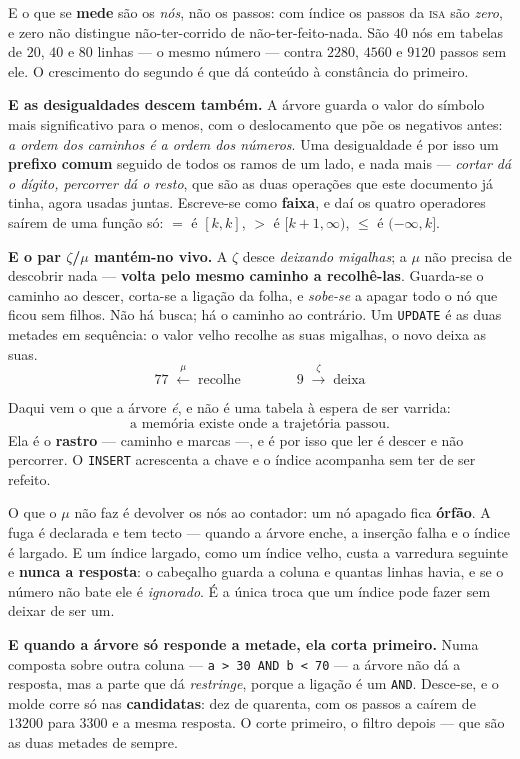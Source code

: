 \documentclass[11pt,a4paper]{article}
\newcommand{\code}[1]{\texttt{\small #1}}
\begin{document}
\medskip\noindent E o que se \textbf{mede} são os \emph{nós}, não os passos:
com índice os passos da \textsc{isa} são \emph{zero}, e zero não distingue
não-ter-corrido de não-ter-feito-nada. São $40$ nós em tabelas de $20$, $40$ e
$80$ linhas --- o mesmo número --- contra $2280$, $4560$ e $9120$ passos sem
ele. O crescimento do segundo é que dá conteúdo à constância do primeiro.

\medskip\noindent\textbf{E as desigualdades descem também.} A árvore guarda o
valor do símbolo mais significativo para o menos, com o deslocamento que põe os
negativos antes: \emph{a ordem dos caminhos é a ordem dos números}. Uma
desigualdade é por isso um \textbf{prefixo comum} seguido de todos os ramos de
um lado, e nada mais --- \emph{cortar dá o dígito, percorrer dá o resto}, que
são as duas operações que este documento já tinha, agora usadas juntas.
Escreve-se como \textbf{faixa}, e daí os quatro operadores saírem de uma função
só: $=$ é $[k,k]$, $>$ é $[k+1,\infty)$, $\le$ é $(-\infty,k]$.

\medskip\noindent\textbf{E o par $\zeta$/$\mu$ mantém-no vivo.} A $\zeta$ desce
\emph{deixando migalhas}; a $\mu$ não precisa de descobrir nada --- \textbf{volta
pelo mesmo caminho a recolhê-las}. Guarda-se o caminho ao descer, corta-se a
ligação da folha, e \emph{sobe-se} a apagar todo o nó que ficou sem filhos. Não
há busca; há o caminho ao contrário. Um \code{UPDATE} é as duas metades em
sequência: o valor velho recolhe as suas migalhas, o novo deixa as suas.
\[
77 \;\overset{\mu}{\longleftarrow}\; \text{recolhe}
\qquad\qquad
9 \;\overset{\zeta}{\longrightarrow}\; \text{deixa}
\]

\medskip\noindent Daqui vem o que a árvore \emph{é}, e não é uma tabela à espera
de ser varrida:
\[
\boxed{\;\text{a memória existe onde a trajetória passou.}\;}
\]
Ela é o \textbf{rastro} --- caminho e marcas ---, e é por isso que ler é descer
e não percorrer. O \code{INSERT} acrescenta a chave e o índice acompanha sem
ter de ser refeito.

\medskip\noindent O que o $\mu$ não faz é devolver os nós ao contador: um nó
apagado fica \textbf{órfão}. A fuga é declarada e tem tecto --- quando a árvore
enche, a inserção falha e o índice é largado. E um índice largado, como um
índice velho, custa a varredura seguinte e \textbf{nunca a resposta}: o
cabeçalho guarda a coluna e quantas linhas havia, e se o número não bate ele é
\emph{ignorado}. É a única troca que um índice pode fazer sem deixar de ser um.

\medskip\noindent\textbf{E quando a árvore só responde a metade, ela corta
primeiro.} Numa composta sobre outra coluna --- \code{a > 30 AND b < 70} --- a
árvore não dá a resposta, mas a parte que dá \emph{restringe}, porque a ligação
é um \code{AND}. Desce-se, e o molde corre só nas \textbf{candidatas}: dez de
quarenta, com os passos a caírem de $13200$ para $3300$ e a mesma resposta. O
corte primeiro, o filtro depois --- que são as duas metades de sempre.
\end{document}
